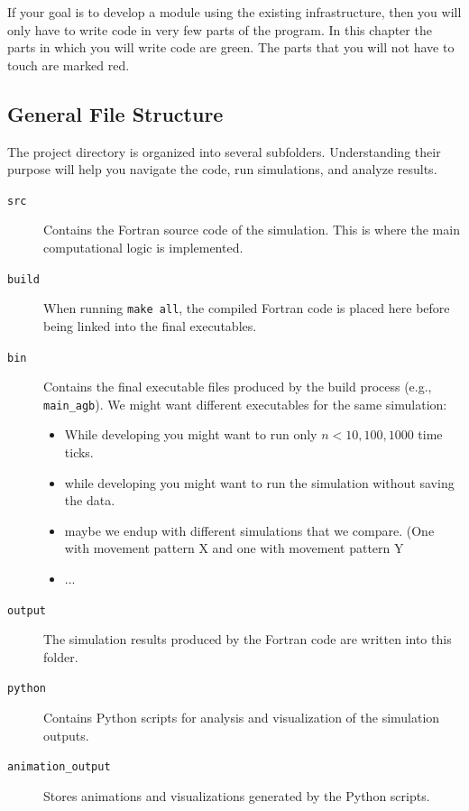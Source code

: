 \documentclass[11pt,a4paper]{article}
\begin{document}
If your goal is to develop a module using the existing infrastructure, then you will only have to write code in very few parts of the program. In this chapter the parts in which you will write code are \color{green} green\color{black}. The parts that you will not have to touch are marked \color{red}red\color{black}.

\subsection{General File Structure}

The project directory is organized into several subfolders. 
Understanding their purpose will help you navigate the code, run simulations, and analyze results.

\begin{description}
    \item[\texttt{src}]  
    Contains the Fortran source code of the simulation. This is where the main computational logic is implemented.  

    \item[\texttt{build}]  
    When running \texttt{make all}, the compiled Fortran code is placed here before being linked into the final executables.  

    \item[\texttt{bin}]  
    Contains the final executable files produced by the build process (e.g., \texttt{main\_agb}). We might want different executables for the same simulation: \begin{itemize}
        \item[-] While developing you might want to run only $n< 10,100,1000 $ time ticks.
        \item[-] while developing you might want to run the simulation without saving the data.
        \item[-] maybe we endup with different simulations that we compare. (One with movement pattern X and one with movement pattern Y
        \item[-] ...
    \end{itemize} 

    \item[\texttt{output}]  
    The simulation results produced by the Fortran code are written into this folder.  

    \item[\texttt{python}]  
    Contains Python scripts for analysis and visualization of the simulation outputs.  

    \item[\texttt{animation\_output}]  
    Stores animations and visualizations generated by the Python scripts.  


\end{description}
\end{document}

